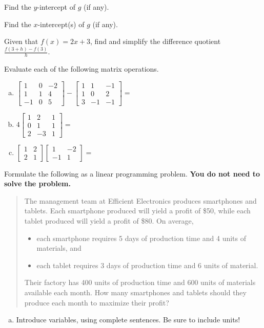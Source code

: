 \documentclass[12pt,legalpaper]{exam}
\newcommand{\MATRIX}[2]{\ensuremath{\left[\begin{array}{#1}#2\end{array}\right]}}
\newcommand{\ds}{\displaystyle}
\begin{document}
\begin{questions}
\begin{compactenum}[(a)]
\item Find the $y$-intercept of $g$ (if any).
\vspace{5cm}

\item Find the $x$-intercept(s) of $g$ (if any).
\vspace{5cm}
\end{compactenum}
\newpage

\question[3] Given that $f(x) = 2x+3$, find and simplify the difference quotient $\ds{\frac{f(3 + h) - f(3)}{h}}$.
\vspace{8cm}

\question[6] Evaluate each of the following matrix operations.
\begin{enumerate}[(a)]
\item $\MATRIX{rrr}{1 & 0 & -2\\1 & 1 & 4\\-1 & 0 & 5} - \MATRIX{rrr}{1 & 1 & -1\\1 & 0 & 2\\3 & -1 & -1} = $
\vfill

\item $4\MATRIX{rrr}{1 & 2 & 1\\0 & 1 & 1\\2 & -3 & 1} = $
\vfill

\item $\MATRIX{rr}{1 & 2\\2 & 1}\MATRIX{rr}{1 & -2\\-1 & 1} = $
\vfill
\end{enumerate}
\newpage

\question[5] Formulate the following as a linear programming problem.  \textbf{You do not need to solve the problem.}
\begin{quote}
The management team at Efficient Electronics produces smartphones and tablets.  Each smartphone produced will yield a profit of \$50, while each tablet produced will yield a profit of \$80.  On average,
\begin{itemize}
\item each smartphone requires 5 days of production time and 4 units of materials, and
\item each tablet requires 3 days of production time and 6 units of material.
\end{itemize}
Their factory has 400 units of production time and 600 units of materials available each month.  How many smartphones and tablets should they produce each month to maximize their profit?
\end{quote}
\begin{enumerate}[(a)]
\item Introduce variables, using complete sentences.  Be sure to include units!
\vspace{4cm}


\end{enumerate}
\end{questions}
\end{document}
